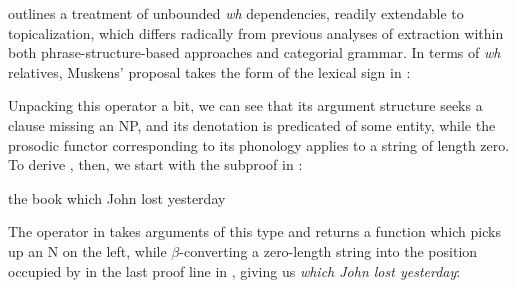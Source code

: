 \documentclass[output=paper,colorlinks,citecolor=brown]{langscibook}
\begin{document}
\citet{muskens03} outlines a treatment of unbounded \textit{wh} dependencies,
readily extendable to topicalization, which differs radically from
previous analyses of extraction within both phrase-structure-based
approaches and categorial grammar. In terms of \textit{wh} relatives,
Muskens' proposal takes the form of the lexical sign in :

\begin{exe}
 \ex\label{whrel}
  \LexEnt{\pt{λ \ensuremath{\greeks}. which \BobsO \ensuremath{\greeks}(\E)}}{\sem{ λP λQ λw. P(w) \ensuremath{ \wedge\xspace } Q(w)}}{\syncat{(N\bsl{}N)\vs (S\vs NP)}}
\end{exe}
Unpacking this operator a bit, we can see that its argument structure
seeks a clause missing an NP, and its denotation is predicated of
some entity, while the prosodic functor corresponding to its phonology
applies to a string of length zero. To derive , then, we start
with the subproof in :

\begin{exe}
 \ex\label{book}
  the book which John lost yesterday
\end{exe}
\begin{exe}
 \ex\label{bookProof1}
\end{exe}
The operator in  takes arguments of this type and returns a
function which picks up an N on the left, while $\beta$-converting a
zero-length string into the position occupied by  in the last
proof line in , giving us \textit{which John lost yesterday}:
\end{document}
